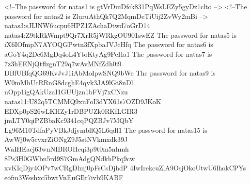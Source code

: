 <!--The password for natas1 is gtVrDuiDfck831PqWsLEZy5gyDz1clto -->
<!--The password for natas2 is ZluruAthQk7Q2MqmDeTiUij2ZvWy2mBi -->
natas3:sJIJNW6ucpu6HPZ1ZAchaDtwd7oGrD14
natas4:Z9tkRkWmpt9Qr7XrR5jWRkgOU901swEZ
The password for natas5 is iX6IOfmpN7AYOQGPwtn3fXpbaJVJcHfq
The password for natas6 is aGoY4q2Dc6MgDq4oL4YtoKtyAg9PeHa1
The password for natas7 is 7z3hEENjQtflzgnT29q7wAvMNfZdh0i9
DBfUBfqQG69KvJvJ1iAbMoIpwSNQ9bWe
The password for natas9 is W0mMhUcRRnG8dcghE4qvk3JA9lGt8nDl
nOpp1igQAkUzaI1GUUjzn1bFVj7xCNzu
natas11:U82q5TCMMQ9xuFoI3dYX61s7OZD9JKoK
EDXp0pS26wLKHZy1rDBPUZk0RKfLGIR3
jmLTY0qiPZBbaKc9341cqPQZBJv7MQbY
Lg96M10TdfaPyVBkJdjymbllQ5L6qdl1
The password for natas15 is AwWj0w5cvxrZiONgZ9J5stNVkmxdk39J
WaIHEacj63wnNIBROHeqi3p9t0m5nhmh
8Ps3H0GWbn5rd9S7GmAdgQNdkhPkq9cw
xvKIqDjy4OPv7wCRgDlmj0pFsCsDjhdP
4IwIrekcuZlA9OsjOkoUtwU6lhokCPYs
eofm3Wsshxc5bwtVnEuGIlr7ivb9KABF
